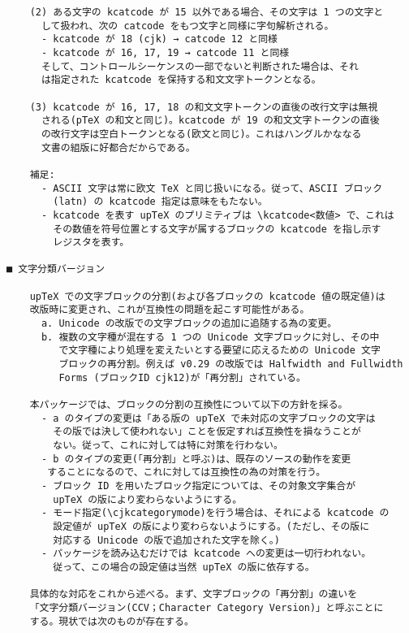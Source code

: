 \documentclass[uplatex,dvipdfmx,a4paper]{jsarticle}
\begin{document}
\begin{verbatim}
    (2) ある文字の kcatcode が 15 以外である場合、その文字は 1 つの文字と
      して扱われ、次の catcode をもつ文字と同様に字句解析される。
      - kcatcode が 18 (cjk) → catcode 12 と同様
      - kcatcode が 16, 17, 19 → catcode 11 と同様
      そして、コントロールシーケンスの一部でないと判断された場合は、それ
      は指定された kcatcode を保持する和文文字トークンとなる。

    (3) kcatcode が 16, 17, 18 の和文文字トークンの直後の改行文字は無視
      される(pTeX の和文と同じ)。kcatcode が 19 の和文文字トークンの直後
      の改行文字は空白トークンとなる(欧文と同じ)。これはハングルかななる
      文書の組版に好都合だからである。

    補足:
      - ASCII 文字は常に欧文 TeX と同じ扱いになる。従って、ASCII ブロック
        (latn) の kcatcode 指定は意味をもたない。
      - kcatcode を表す upTeX のプリミティブは \kcatcode<数値> で、これは
        その数値を符号位置とする文字が属するブロックの kcatcode を指し示す
        レジスタを表す。

■ 文字分類バージョン

    upTeX での文字ブロックの分割(および各ブロックの kcatcode 値の既定値)は
    改版時に変更され、これが互換性の問題を起こす可能性がある。
      a. Unicode の改版での文字ブロックの追加に追随する為の変更。
      b. 複数の文字種が混在する 1 つの Unicode 文字ブロックに対し、その中
         で文字種により処理を変えたいとする要望に応えるための Unicode 文字
         ブロックの再分割。例えば v0.29 の改版では Halfwidth and Fullwidth
         Forms (ブロックID cjk12)が「再分割」されている。

    本パッケージでは、ブロックの分割の互換性について以下の方針を採る。
      - a のタイプの変更は「ある版の upTeX で未対応の文字ブロックの文字は
        その版では決して使われない」ことを仮定すれば互換性を損なうことが
        ない。従って、これに対しては特に対策を行わない。
      - b のタイプの変更(「再分割」と呼ぶ)は、既存のソースの動作を変更
       することになるので、これに対しては互換性の為の対策を行う。
      - ブロック ID を用いたブロック指定については、その対象文字集合が
        upTeX の版により変わらないようにする。
      - モード指定(\cjkcategorymode)を行う場合は、それによる kcatcode の
        設定値が upTeX の版により変わらないようにする。(ただし、その版に
        対応する Unicode の版で追加された文字を除く。)
      - パッケージを読み込むだけでは kcatcode への変更は一切行われない。
        従って、この場合の設定値は当然 upTeX の版に依存する。

    具体的な対応をこれから述べる。まず、文字ブロックの「再分割」の違いを
    「文字分類バージョン(CCV；Character Category Version)」と呼ぶことに
    する。現状では次のものが存在する。


\end{verbatim}
\end{document}
